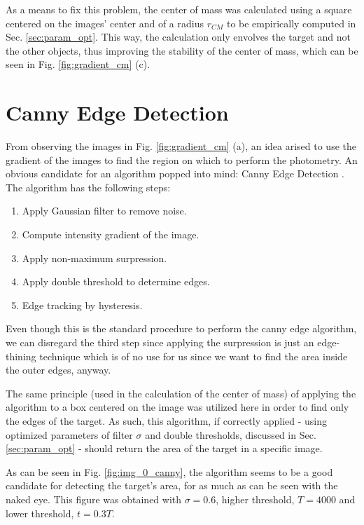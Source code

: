 \documentclass{aa}
\begin{document}
As a means to fix this problem, the center of mass was calculated using a square centered on the images' center and of a radius $r_{CM}$ to be empirically computed in Sec. \ref{sec:param_opt}. This way, the calculation only envolves the target and not the other objects, thus improving the stability of the center of mass, which can be seen in Fig. \ref{fig:gradient_cm} (c).

\section{Canny Edge Detection}

From observing the images in Fig. \ref{fig:gradient_cm} (a), an idea arised to use the gradient of the images to find the region on which to perform the photometry. An obvious candidate for an algorithm popped into mind: Canny Edge Detection \cite{canny}. The algorithm has the following steps:

\begin{enumerate}
\item Apply Gaussian filter to remove noise.
\item Compute intensity gradient of the image.
\item Apply non-maximum surpression.
\item Apply double threshold to determine edges.
\item Edge tracking by hysteresis.
\end{enumerate}

Even though this is the standard procedure to perform the canny edge algorithm, we can disregard the third step since applying the surpression is just an edge-thining technique which is of no use for us since we want to find the area inside the outer edges, anyway.

The same principle (used in the calculation of the center of mass) of applying the algorithm to a box centered on the image was utilized here in order to find only the edges of the target. As such, this algorithm, if correctly applied - using optimized parameters of filter $\sigma$ and double thresholds, discussed in Sec. \ref{sec:param_opt} - should return the area of the target in a specific image.

As can be seen in Fig. \ref{fig:img_0_canny}, the algorithm seems to be a good candidate for detecting the target's area, for as much as can be seen with the naked eye. This figure was obtained with $\sigma = 0.6$, higher threshold, $T = 4000$ and lower threshold, $t = 0.3T$.
\end{document}
